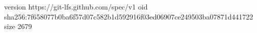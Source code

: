 version https://git-lfs.github.com/spec/v1
oid sha256:7f658077b0ba6f57d07c582b1d592916f03ed06907ce249503ba07871d441722
size 2679
